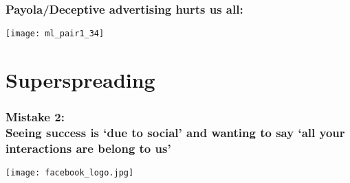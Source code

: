 


\begin{frame}
  \frametitle{Payola/Deceptive advertising hurts us all:}

  \begin{center}
    \texttt{[image: ml\_pair1\_34]}
  \end{center}

\end{frame}


\section{Superspreading}


\begin{frame}
  \frametitle{Mistake 2:\\ Seeing success is `due to social' and wanting to say
    `all your interactions are belong to us'}

  \texttt{[image: facebook\_logo.jpg]}




\end{frame}

